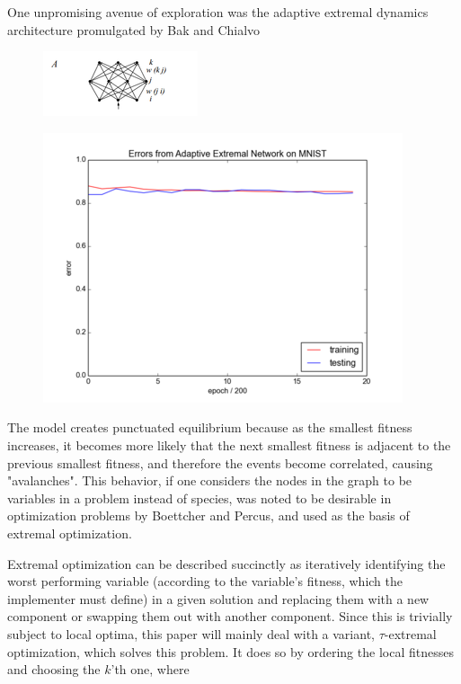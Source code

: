 \documentclass[12pt]{article}
\begin{document}
One unpromising avenue of exploration was the adaptive extremal dynamics architecture promulgated by Bak and Chialvo  %
  \begin{figure}
    \includegraphics{bak_chialvo_net_topology}
  \end{figure}
  \begin{figure}
    \includegraphics{bak_plot}
  \end{figure}

The model creates punctuated equilibrium because as the smallest fitness increases, it becomes more likely that the next smallest fitness is adjacent to the previous smallest fitness, and therefore the events become correlated, causing "avalanches". This behavior, if one considers the nodes in the graph to be variables in a problem instead of species, was noted to be desirable in optimization problems by Boettcher and Percus, and used as the basis of extremal optimization.

Extremal optimization can be described succinctly as iteratively identifying the worst performing variable (according to the variable's fitness, which the implementer must define) in a given solution and replacing them with a new component or swapping them out with another component. Since this is trivially subject to local optima, this paper will mainly deal with a variant, $\tau$-extremal optimization, which solves this problem. It does so by ordering the local fitnesses and choosing the $k$'th one, where
\end{document}

